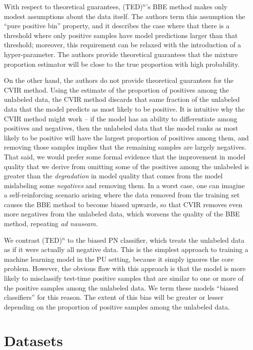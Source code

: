 \documentclass[conference]{IEEEtran}
\begin{document}
    With respect to theoretical guarantees, (TED)${}^n$'s BBE method makes only modest assumptions about the data itself. The authors term this assumption the ``pure positive bin'' property, and it describes the case where that there is a threshold where only positive samples have model predictions larger than that threshold; moreover, this requirement can be relaxed with the introduction of a hyper-parameter. The authors provide theoretical guarantees that the mixture proportion estimator will be close to the true proportion with high probability.

    On the other hand, the authors do not provide theoretical guarantees for the CVIR method. Using the estimate of the proportion of positives among the unlabeled data, the CVIR method discards that same fraction of the unlabeled data that the model predicts as most likely to be positive. It is intuitive why the CVIR method might work -- if the model has an ability to differentiate among positives and negatives, then the unlabeled data that the model ranks as most likely to be positive will have the largest proportion of positives among them, and removing those samples implies that the remaining samples are largely negatives. That said, we would prefer some formal evidence that the improvement in model quality that we derive from omitting some of the positives among the unlabeled is greater than the \textit{degradation} in model quality that comes from the model mislabeling some \textit{negatives} and removing them. In a worst case, one can imagine a self-reinforcing scenario arising where the data removed from the training set causes the BBE method to become biased upwards, so that CVIR removes even more negatives from the unlabeled data, which worsens the quality of the BBE method, repeating \textit{ad nauseam.}

    We contrast (TED)${}^n$ to the biased PN classifier, which treats the unlabeled data as if it were actually all negative data. This is the simplest approach to training a machine learning model in the PU setting, because it simply ignores the core problem. However, the obvious flaw with this approach is that the model is more likely to misclassify test-time positive samples that are similar to one or more of the positive samples among the unlabeled data. We term these models ``biased classifiers'' for this reason. The extent of this bias will be greater or lesser depending on the proportion of positive samples among the unlabeled data.

\section{Datasets}
\label{sec:data}
\end{document}

